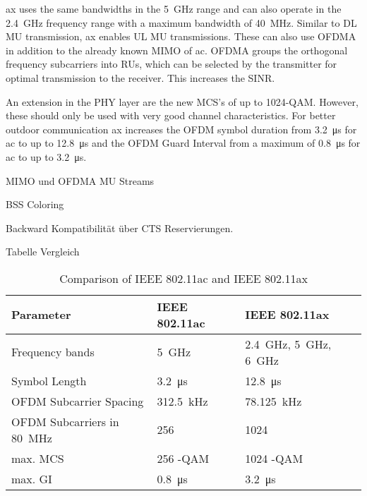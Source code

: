 \ac{ax} uses the same bandwidths in the \SI{5}{\giga\hertz} range and can also operate in the \SI{2.4}{\giga\hertz} frequency range with a maximum bandwidth of \SI{40}{\mega\hertz}. Similar to DL MU transmission, \ac{ax} enables UL MU transmissions. These can also use \ac{OFDMA} in addition to the already known \ac{MIMO} of \ac{ac}. \ac{OFDMA} groups the orthogonal frequency subcarriers into \ac{RU}s, which can be selected by the transmitter for optimal transmission to the receiver. This increases the \ac{SINR}.

An extension in the PHY layer are the new \ac{MCS}'s of up to 1024-\ac{QAM}. However, these should only be used with very good channel characteristics.
 For better outdoor communication \ac{ax} increases the \ac{OFDM} symbol duration from \SI{3.2}{\micro\second} for \ac{ac} to up to \SI{12.8}{\micro\second} and the \ac{OFDM} Guard Interval from a maximum of \SI{0.8}{\micro\second} for \ac{ac} to up to \SI{3.2}{\micro\second}.   
 
MIMO und OFDMA MU Streams

BSS Coloring

Backward Kompatibilität über CTS Reservierungen.

Tabelle Vergleich

\begin{table}[!ht]
	\centering
	\begin{tabular}{>{\raggedright}p{1.7cm}p{5.4cm}p{3.4cm}}
		\toprule
		Parameter & IEEE 802.11ac & IEEE 802.11ax \\
		\midrule
		Frequency bands & \SI{5}{\giga\hertz}&
		\SI{2.4}{\giga\hertz}, \SI{5}{\giga\hertz}, \SI{6}{\giga\hertz}\\
		Symbol Length & \SI{3.2}{\micro\second}&
		\SI{12.8}{\micro\second}\\
		\ac{OFDM} Subcarrier Spacing &
		\SI{312.5}{\kilo\hertz} &
		\SI{78.125}{\kilo\hertz} \\
		\ac{OFDM} Subcarriers in \SI{80}{\mega\hertz} &
		256 &
		1024 \\
		max. \ac{MCS} &
		256 -\ac{QAM} &
		1024 -\ac{QAM} \\
		max. \ac{GI} &
		\SI{0.8}{\micro\second} &
		\SI{3.2}{\micro\second} \\
		\bottomrule
	\end{tabular}
	\caption{Comparison of IEEE 802.11ac and IEEE 802.11ax}
	\label{tab:SensorNetworkApplications}
\end{table}